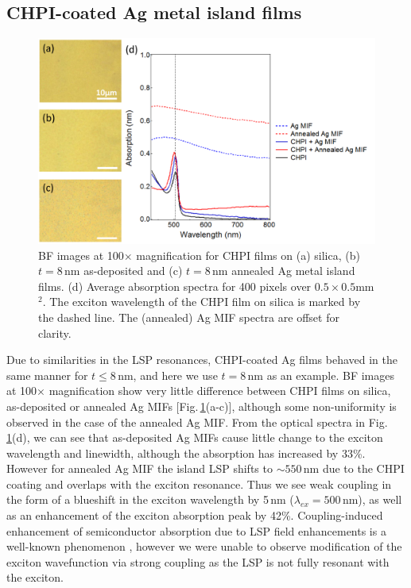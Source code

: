 \subsection{CHPI-coated Ag metal island films}
\label{sec:CHPI_AgMIF}
\begin{figure}[h!] 
\centering    
\includegraphics[width=\textwidth]{Fig7}
\caption{BF images at 100$\times$ magnification for CHPI films on (a) silica, (b) $t=8$\,nm as-deposited and (c) $t=8$\,nm annealed Ag metal island films. (d) Average absorption spectra for 400 pixels over $0.5\times0.5$mm$^2$. The exciton wavelength of the CHPI film on silica is marked by the dashed line. The (annealed) Ag MIF spectra are offset for clarity.}
\label{6Fig7}
\end{figure}
Due to similarities in the LSP resonances, CHPI-coated Ag films behaved in the same manner for $t\leq8$\,nm, and here we use $t=8$\,nm as an example. %
BF images at 100$\times$ magnification show very little difference between CHPI films on silica, as-deposited or annealed Ag MIFs [Fig.\,\ref{6Fig7}(a-c)], although some non-uniformity is observed in the case of the annealed Ag MIF. From the optical spectra in Fig.\,\ref{6Fig7}(d), we can see that as-deposited Ag MIFs cause little change to the exciton wavelength and linewidth, although the absorption has increased by 33\%. However for annealed Ag MIF the island LSP shifts to $\sim550$\,nm due to the CHPI coating and overlaps with the exciton resonance. Thus we see weak coupling in the form of a blueshift in the exciton wavelength by 5\,nm  ($\lambda_{ex}=500$\,nm), as well as an enhancement of the exciton absorption peak by 42\%. Coupling-induced enhancement of semiconductor absorption due to LSP field enhancements is a well-known phenomenon \cite{Balci2014, Alemu2014, Zheng2011, Xu2013, Spinelli2012}, however we were unable to observe modification of the exciton wavefunction via strong coupling as the LSP is not fully resonant with the exciton.

